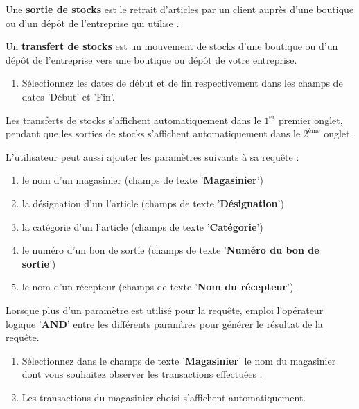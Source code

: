 Une \textbf{sortie de stocks} est le retrait d'articles
par un client aupr\`es d'une boutique ou d'un d\'ep\^ot
de l'entreprise qui utilise \yeren.

Un \textbf{transfert de stocks} est un mouvement de stocks
d'une boutique ou d'un d\'ep\^ot de l'entreprise vers une
boutique ou d\'ep\^ot de votre entreprise.



\begin{enumerate}[1)]
	\item S\'electionnez les dates de d\'ebut et de
	fin respectivement dans les champs de dates
	'D\'ebut' et 'Fin'.
\end{enumerate}

Les transferts de stocks s'affichent automatiquement
dans le $1^{\text{er}}$ premier onglet, pendant que
les sorties de stocks s'affichent automatiquement
dans le $2^{\text{\`eme}}$ onglet.	

L'utilisateur peut aussi ajouter les param\`etres suivants
\`a sa requ\^ete :

\begin{enumerate}[1)]
	\item le nom d'un magasinier (champs de texte 
	'\textbf{Magasinier}')
	\item la d\'esignation d'un l'article 
		(champs de texte '\textbf{D\'esignation}')
	\item la cat\'egorie d'un l'article 
		(champs de texte '\textbf{Cat\'egorie}')
	\item le num\'ero d'un bon de sortie 
		(champs de texte '\textbf{Num\'ero du bon de sortie}')
	\item le nom d'un r\'ecepteur
		(champs de texte '\textbf{Nom du r\'ecepteur}').
\end{enumerate}

Lorsque plus d'un param\`etre est utilis\'e pour
la requ\^ete, \yeren emploi l'op\'erateur logique
'\textbf{AND}' entre les diff\'erents param\`tres
pour g\'en\'erer le r\'esultat de la requ\^ete.



\begin{enumerate}[1)]
	\item S\'electionnez dans le champs de texte
	'\textbf{Magasinier}' le nom du magasinier dont
	vous souhaitez observer les transactions effectu\'ees .
	
	\item Les transactions du magasinier choisi
	s'affichent automatiquement.
\end{enumerate}

